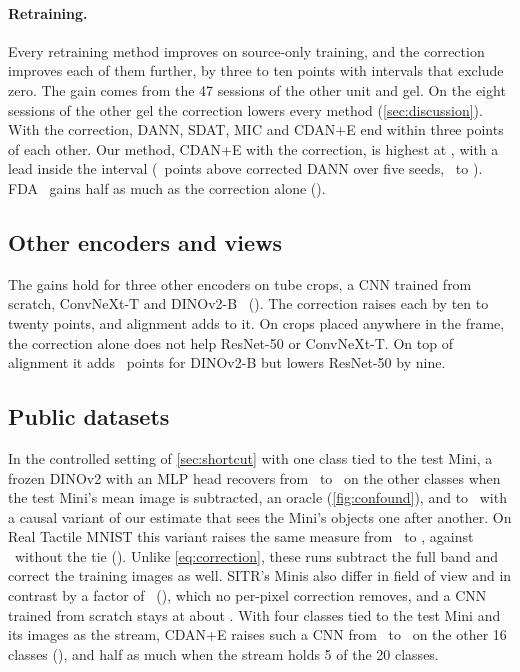 \paragraph{Retraining.}
Every retraining method improves on source-only training, and the correction improves each of them further, by three to ten points with intervals that exclude zero. The gain comes from the 47 sessions of the other unit and gel. On the eight sessions of the other gel the correction lowers every method (\cref{sec:discussion}). With the correction, DANN, SDAT, MIC and CDAN+E end within three points of each other. Our method, CDAN+E with the correction, is highest at \XpFullAcc\pct, with a lead inside the interval (\XdFullVsDannRead\ points above corrected DANN over five seeds, \XdFullVsDannReadLo\ to \XdFullVsDannReadHi). FDA~\cite{fda2020} gains half as much as the correction alone ().

\subsection{Other encoders and views}
\label{sec:encoders}

The gains hold for three other encoders on tube crops, a CNN trained from scratch, ConvNeXt-T and DINOv2-B~\cite{oquab2024dinov2} (). The correction raises each by ten to twenty points, and alignment adds to it. On crops placed anywhere in the frame, the correction alone does not help ResNet-50 or ConvNeXt-T. On top of alignment it adds \XdDinoFrameReadVsCdan\ points for DINOv2-B but lowers ResNet-50 by nine.

\subsection{Public datasets}
\label{sec:second}

In the controlled setting of \cref{sec:shortcut} with one class tied to the test Mini, a frozen DINOv2 with an MLP head recovers from \CfSitrRawOneCross\ to \CfSitrStreamOneCross\pct\ on the other classes when the test Mini's mean image is subtracted, an oracle (\cref{fig:confound}), and to \CfTrkSitrOneCross\pct\ with a causal variant of our estimate that sees the Mini's objects one after another. On Real Tactile MNIST this variant raises the same measure from \CfTmdRawOneCross\ to \CfTrkTmOneCross\pct, against \CfTmdRawZeroCross\pct\ without the tie (). Unlike \cref{eq:correction}, these runs subtract the full band and correct the training images as well. SITR's Minis also differ in field of view and in contrast by a factor of \SmContrastRatio\ (), which no per-pixel correction removes, and a CNN trained from scratch stays at about \SmStreamCross\pct. With four classes tied to the test Mini and its images as the stream, CDAN+E raises such a CNN from \XsJit\ to \XsCdan\pct\ on the other 16 classes (), and half as much when the stream holds 5 of the 20 classes.


